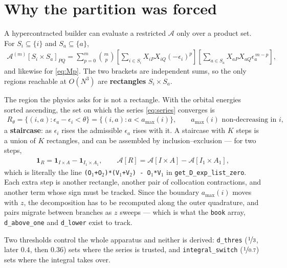 \documentclass[11pt]{article}
\newcommand{\sqrbrckts}[1]{\left[#1\right]}
\newcommand{\Dcal}{\mathcal{A}}
\newcommand{\code}[1]{\texttt{\small #1}}
\begin{document}
\section{Why the partition was forced}

A hypercontracted builder can evaluate a restricted $\Dcal$ only over a product set. For
$S_i \subseteq \{i\}$ and $S_a \subseteq \{a\}$,
\begin{align}
    \Dcal^{(m)}\sqrbrckts{S_i \times S_a}_{PQ}
    = \sum_{p=0}^{m} \binom{m}{p}
      \sqrbrckts{\sum_{i \in S_i} X_{iP} X_{iQ} (-\epsilon_i)^p}
      \sqrbrckts{\sum_{a \in S_a} X_{aP} X_{aQ} \epsilon_a^{\,m-p}} ,
    \label{eq:rectangle}
\end{align}
and likewise for \eqref{eq:Mp}. The two brackets are independent sums, so the only regions
reachable at $O(N^3)$ are \textbf{rectangles} $S_i \times S_a$.

The region the physics asks for is not a rectangle. With the orbital energies sorted
ascending, the set on which the series \eqref{eq:series} converges is
\begin{align}
    R_\theta = \{(i,a) : \epsilon_a - \epsilon_i < \theta \}
             = \{(i,a) : a < a_{\max}(i)\} ,
    \qquad a_{\max}(i) \text{ non-decreasing in } i ,
\end{align}
a \textbf{staircase}: as $\epsilon_i$ rises the admissible $\epsilon_a$ rises with it. A
staircase with $K$ steps is a union of $K$ rectangles, and can be assembled by
inclusion--exclusion --- for two steps,
\begin{align}
    \bm{1}_{R} = \bm{1}_{I \times A} - \bm{1}_{I_1 \times A_1} ,
    \qquad
    \Dcal\sqrbrckts{R} = \Dcal\sqrbrckts{I \times A} - \Dcal\sqrbrckts{I_1 \times A_1} ,
    \label{eq:inclusion}
\end{align}
which is literally the line
\code{(O$_1$+O$_2$)*(V$_1$+V$_2$) - O$_1$*V$_1$} in \code{get\_D\_exp\_list\_zero}. Each
extra step is another rectangle, another pair of collocation contractions, and another term
whose sign must be tracked. Since the boundary $a_{\max}(i)$ moves with $z$, the
decomposition has to be recomputed along the outer quadrature, and pairs migrate between
branches as $z$ sweeps --- which is what the \code{book} array, \code{d\_above\_one} and
\code{d\_lower} exist to track.

Two thresholds control the whole apparatus and neither is derived: \code{d\_thres}
($\nicefrac{1}{3}$, later $0.4$, then $0.36$) sets where the series is trusted, and
\code{integral\_switch} ($\nicefrac{1}{0.7}$) sets where the integral takes over.
\end{document}
